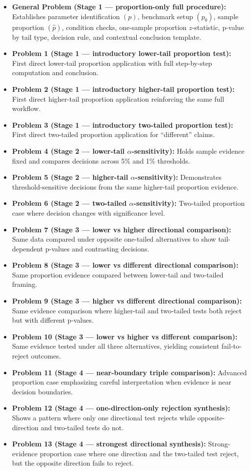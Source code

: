 \begin{itemize}
    \item \textbf{General Problem (Stage 1 --- proportion-only full procedure):} Establishes parameter identification \((p)\), benchmark setup \((p_0)\), sample proportion \((\hat p)\), condition checks, one-sample proportion \(z\)-statistic, p-value by tail type, decision rule, and contextual conclusion template.
    \item \textbf{Problem 1 (Stage 1 --- introductory lower-tail proportion test):} First direct lower-tail proportion application with full step-by-step computation and conclusion.
    \item \textbf{Problem 2 (Stage 1 --- introductory higher-tail proportion test):} First direct higher-tail proportion application reinforcing the same full workflow.
    \item \textbf{Problem 3 (Stage 1 --- introductory two-tailed proportion test):} First direct two-tailed proportion application for ``different'' claims.
    \item \textbf{Problem 4 (Stage 2 --- lower-tail \(\alpha\)-sensitivity):} Holds sample evidence fixed and compares decisions across 5\% and 1\% thresholds.
    \item \textbf{Problem 5 (Stage 2 --- higher-tail \(\alpha\)-sensitivity):} Demonstrates threshold-sensitive decisions from the same higher-tail proportion evidence.
    \item \textbf{Problem 6 (Stage 2 --- two-tailed \(\alpha\)-sensitivity):} Two-tailed proportion case where decision changes with significance level.
    \item \textbf{Problem 7 (Stage 3 --- lower vs higher directional comparison):} Same data compared under opposite one-tailed alternatives to show tail-dependent p-values and contrasting decisions.
    \item \textbf{Problem 8 (Stage 3 --- lower vs different directional comparison):} Same proportion evidence compared between lower-tail and two-tailed framing.
    \item \textbf{Problem 9 (Stage 3 --- higher vs different directional comparison):} Same evidence comparison where higher-tail and two-tailed tests both reject but with different p-values.
    \item \textbf{Problem 10 (Stage 3 --- lower vs higher vs different comparison):} Same evidence tested under all three alternatives, yielding consistent fail-to-reject outcomes.
    \item \textbf{Problem 11 (Stage 4 --- near-boundary triple comparison):} Advanced proportion case emphasizing careful interpretation when evidence is near decision boundaries.
    \item \textbf{Problem 12 (Stage 4 --- one-direction-only rejection synthesis):} Shows a pattern where only one directional test rejects while opposite-direction and two-tailed tests do not.
    \item \textbf{Problem 13 (Stage 4 --- strongest directional synthesis):} Strong-evidence proportion case where one direction and the two-tailed test reject, but the opposite direction fails to reject.
\end{itemize}

